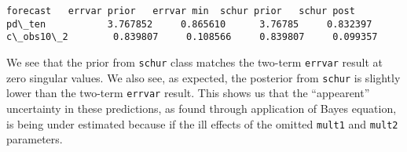 \documentclass{article}
\begin{document}
    \begin{Verbatim}[commandchars=\\\{\}]
forecast   errvar prior   errvar min  schur prior   schur post
pd\_ten           3.767852     0.865610      3.76785     0.832397
c\_obs10\_2        0.839807     0.108566     0.839807     0.099357
    \end{Verbatim}

    We see that the prior from \texttt{schur} class matches the two-term
\texttt{errvar} result at zero singular values. We also see, as
expected, the posterior from \texttt{schur} is slightly lower than the
two-term \texttt{errvar} result. This shows us that the ``appearent''
uncertainty in these predictions, as found through application of Bayes
equation, is being under estimated because if the ill effects of the
omitted \texttt{mult1} and \texttt{mult2} parameters.


    
    
    
    
\end{document}
